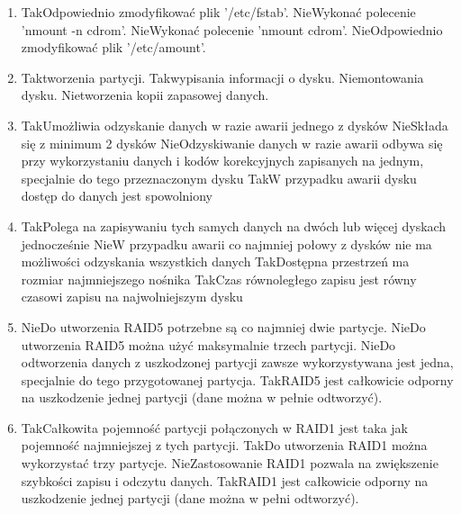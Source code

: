 \begin{enumerate}
		\newpage
		\item {}%
		{Tak}{Odpowiednio zmodyfikować plik '/etc/fstab'.}%
		{Nie}{Wykonać polecenie 'nmount -n cdrom'.}%
		{Nie}{Wykonać polecenie 'nmount cdrom'.}%
		{Nie}{Odpowiednio zmodyfikować plik '/etc/amount'.}
		\item {}%
		{Tak}{tworzenia partycji.}%
		{Tak}{wypisania informacji o dysku.}%
		{Nie}{montowania dysku.}%
		{Nie}{tworzenia kopii zapasowej danych.}
		\item {}%
		{Tak}{Umożliwia odzyskanie danych w razie awarii jednego z dysków}%
		{Nie}{Składa się z minimum 2 dysków}%
		{Nie}{Odzyskiwanie danych w razie awarii odbywa się przy wykorzystaniu danych i kodów korekcyjnych zapisanych na jednym, specjalnie do tego przeznaczonym dysku}%
		{Tak}{W przypadku awarii dysku dostęp do danych jest spowolniony}
		\item {}%
		{Tak}{Polega na zapisywaniu tych samych danych na dwóch lub więcej dyskach jednocześnie}%
		{Nie}{W przypadku awarii co najmniej połowy z dysków nie ma możliwości odzyskania wszystkich danych}%
		{Tak}{Dostępna przestrzeń ma rozmiar najmniejszego nośnika}%
		{Tak}{Czas równoległego zapisu jest równy czasowi zapisu na najwolniejszym dysku}
		\item {}%
		{Nie}{Do utworzenia RAID5 potrzebne są co najmniej dwie partycje.}%
		{Nie}{Do utworzenia RAID5 można użyć maksymalnie trzech partycji.}%
		{Nie}{Do odtworzenia danych z uszkodzonej partycji zawsze wykorzystywana jest jedna, specjalnie do tego przygotowanej partycja.}%
		{Tak}{RAID5 jest całkowicie odporny na uszkodzenie jednej partycji (dane można w pełnie odtworzyć).}
		\item {}%
		{Tak}{Całkowita pojemność partycji połączonych w RAID1 jest taka jak pojemność najmniejszej z tych partycji.}%
		{Tak}{Do utworzenia RAID1 można wykorzystać trzy partycje.}%
		{Nie}{Zastosowanie RAID1 pozwala na zwiększenie szybkości zapisu i odczytu danych.}%
		{Tak}{RAID1 jest całkowicie odporny na uszkodzenie jednej partycji (dane można w pełni odtworzyć).}
		
		
		
		
		
		
		
		
		
		
		
		
		
		
		
		
		
		
		
		
		
		
		
		
		
		
		
		
		
	\end{enumerate}